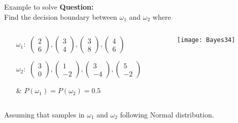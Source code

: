 \begin{frame}{Example to solve}
\textbf{\color{blue} Question:}\\Find the decision boundary between $\omega_1$ and $\omega_2$ where
\begin{columns}
\begin{column}{5cm}
\begin{footnotesize}
\begin{itemize}
\item [$\omega_1:$] $\left( {\begin{array}{*{20}{c}}
2\\
6
\end{array}} \right),\left( {\begin{array}{*{20}{c}}
3\\
4
\end{array}} \right),\left( {\begin{array}{*{20}{c}}
3\\
8
\end{array}} \right),\left( {\begin{array}{*{20}{c}}
4\\
6
\end{array}} \right)$
\item [$\omega_2:$] $\left( {\begin{array}{*{20}{c}}
3\\
0
\end{array}} \right),\left( {\begin{array}{*{20}{c}}
1\\
-2
\end{array}} \right),\left( {\begin{array}{*{20}{c}}
3\\
-4
\end{array}} \right),\left( {\begin{array}{*{20}{c}}
5\\
-2
\end{array}} \right)$
\item [\&] $P(\omega_1)=P(\omega_2)=0.5$
\end{itemize}
\end{footnotesize}
\end{column}
\begin{column}{5cm}
\begin{figure}
\texttt{[image: Bayes34]}
\end{figure}
\end{column}
\end{columns}
Assuming that samples in $\omega_1$ and $\omega_2$ following Normal distribution.
\end{frame}
